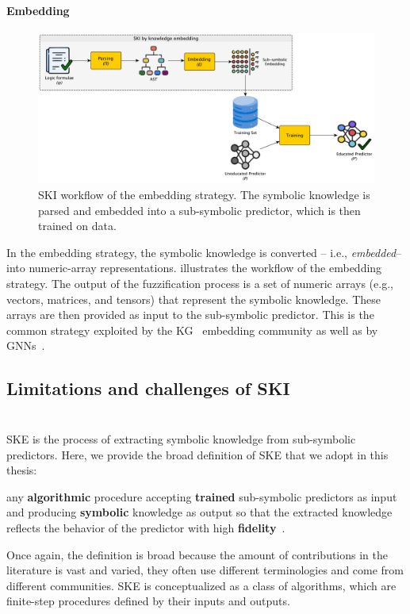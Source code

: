 \paragraph{Embedding}\label{par:ski-embedding}
%
\begin{figure}
    \centering
    \includegraphics[width=.9\linewidth]{figures/workflow-embedding}
    \caption[SKI workflow of embedding strategy]{
        \gls{SKI} workflow of the embedding strategy.
        The symbolic knowledge is parsed and embedded into a sub-symbolic predictor, which is then trained on data.
    }
    \label{fig:workflow-embedding}
\end{figure}
%
In the embedding strategy, the symbolic knowledge is converted -- i.e., \emph{embedded}-- into numeric-array representations.
%
 illustrates the workflow of the embedding strategy.
%
The output of the fuzzification process is a set of numeric arrays (e.g., vectors, matrices, and tensors) that represent the symbolic knowledge.
%
These arrays are then provided as input to the sub-symbolic predictor.
%
This is the common strategy exploited by the \gls{KG}~\cite{DBLP:conf/ijcai/LambGGPAV20} embedding community as well as by \glspl{GNN}~\cite{DBLP:journals/tkde/WangMWG17}.


\subsection[Limitations and challenges of SKI]{Limitations and challenges of \Gls{SKI}}\label{subsec:limitations-and-challenges-of-ski}


\section[Symbolic knowledge extraction]{}\label{sec:ske}
%
\gls{SKE} is the process of extracting symbolic knowledge from sub-symbolic predictors.
%
Here, we provide the broad definition of \gls{SKE} that we adopt in this thesis:
%
\begin{definition}
    \label{def:ske}
    any \textbf{algorithmic} procedure accepting \textbf{trained} sub-symbolic predictors as input and producing \textbf{symbolic} knowledge as output so that the extracted knowledge reflects the behavior of the predictor with high \textbf{fidelity}~\cite{DBLP:journals/csur/CiattoSAMO24}.
\end{definition}
%
Once again, the definition is broad because the amount of contributions in the literature is vast and varied, they often use different terminologies and come from different communities.
%
\Gls{SKE} is conceptualized as a class of algorithms, which are finite-step procedures defined by their inputs and outputs.

